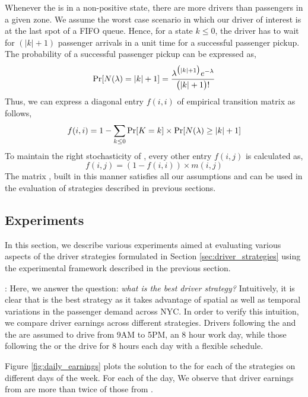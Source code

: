 Whenever the {\markovchain} is in a non-positive state, there are more drivers than passengers in a given zone. We assume the worst case scenario in which our driver of interest is at the last spot of a FIFO queue. Hence, for a state $k \leq 0$, the driver has to wait for $(|k| + 1)$ passenger arrivals in a unit time for a successful passenger pickup. The probability of a successful passenger pickup can be expressed as,
\begin{equation}
\Pr[N(\lambda) = |k| + 1] = \frac{\lambda^{\big(|k|+1\big)} e^{-\lambda}}{\big(|k| + 1\big)!}
\end{equation}
Thus, we can express a diagonal entry $f(i,i)$ of empirical transition matrix as follows,
\begin{equation}
f(i,i) = 1 - \sum_{k \leq 0} \Pr[K = k] \times \Pr[N(\lambda) \geq |k| + 1]
\end{equation}
To maintain the right stochasticity of {\empiricaltransitionmatrix}, every other entry $f(i,j)$ is calculated as,
\begin{equation}
f(i,j) = (1 - f(i,i)) \times m(i,j)
\end{equation}
The matrix {\empiricaltransitionmatrix}, built in this manner satisfies all our assumptions and can be used in the evaluation of strategies described in previous sections.

\subsection{Experiments}
In this section, we describe various experiments aimed at evaluating various aspects of the driver strategies formulated in Section \ref{sec:driver_strategies} using the experimental framework described in the previous section.

: Here, we answer the question: \textit{what is the best driver strategy?} Intuitively, it is clear that {\relocationflexible} is the best strategy as it takes advantage of spatial as well as temporal variations in the passenger demand across NYC. In order to verify this intuition, we compare driver earnings across different strategies. Drivers following the {\naive} and the {\relocation} are assumed to drive from 9AM to 5PM, an 8 hour work day, while those following the {\flexible} or the {\relocationflexible} drive for 8 hours each day with a flexible schedule.

Figure \ref{fig:daily_earnings} plots the solution to the {\originalproblem} for each of the strategies on different days of the week. For each of the day, We observe that driver earnings from {\relocationflexible} are more than twice of those from {\naive}. 

